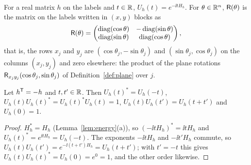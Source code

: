 \begin{definition}\label{def:evolution}
For a real matrix $h$ on the labels and $t\in\mathbb R$, $U_h(t)=e^{-\ii tH_h}$. For $\theta\in\mathbb R^n$,
$\mathsf R(\theta)$ is the matrix on the labels written in $(x,y)$ blocks as
\[
 \mathsf R(\theta)=\begin{pmatrix}\operatorname{diag}(\cos\theta)&-\operatorname{diag}(\sin\theta)\\
 \operatorname{diag}(\sin\theta)&\operatorname{diag}(\cos\theta)\end{pmatrix},
\]
that is, the rows $x_j$ and $y_j$ are $(\cos\theta_j,-\sin\theta_j)$ and
$(\sin\theta_j,\cos\theta_j)$ on the columns $(x_j,y_j)$ and zero elsewhere: the product
of the plane rotations $\mathsf R_{x_jy_j}(\cos\theta_j,\sin\theta_j)$ of Definition~\ref{def:plane}
over $j$.
\end{definition}

\begin{lemma}\label{lem:unitary}
Let $h^{\mathsf T}=-h$ and $t,t'\in\mathbb R$. Then $U_h(t)^*=U_h(-t)$, $U_h(t)U_h(t)^*=U_h(t)^*U_h(t)=1$,
$U_h(t)U_h(t')=U_h(t+t')$ and $U_h(0)=1$.
\end{lemma}
\begin{proof}
$H_h^*=H_h$ (Lemma~\ref{lem:energy}(a)), so $(-\ii tH_h)^*=\ii tH_h$ and
$U_h(t)^*=e^{\ii tH_h}=U_h(-t)$. The exponents $-\ii tH_h$ and $-\ii t'H_h$ commute, so
$U_h(t)U_h(t')=e^{-\ii(t+t')H_h}=U_h(t+t')$; with $t'=-t$ this gives $U_h(t)U_h(t)^*=U_h(0)=e^0=1$,
and the other order likewise.
\end{proof}

